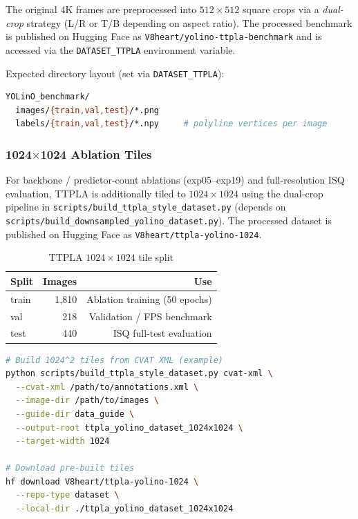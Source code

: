 \documentclass[11pt,a4paper]{article}
\begin{document}
The original 4K frames are preprocessed into $512 \times 512$ square crops via a
\emph{dual-crop} strategy (L/R or T/B depending on aspect ratio).
The processed benchmark is published on Hugging Face as
\texttt{V8heart/yolino-ttpla-benchmark} and is accessed via the
\texttt{DATASET\_TTPLA} environment variable.

Expected directory layout (set via \texttt{DATASET\_TTPLA}):
\begin{lstlisting}[language=bash, numbers=none, frame=none, backgroundcolor=\color{white}]
YOLinO_benchmark/
  images/{train,val,test}/*.png
  labels/{train,val,test}/*.npy     # polyline vertices per image
\end{lstlisting}

\subsubsection{1024$\times$1024 Ablation Tiles}
\label{subsec:ttpla_1024}

For backbone / predictor-count ablations (exp05--exp19) and full-resolution ISQ
evaluation, TTPLA is additionally tiled to $1024 \times 1024$ using the dual-crop
pipeline in \texttt{scripts/build\_ttpla\_style\_dataset.py}
(depends on \texttt{scripts/build\_downsampled\_yolino\_dataset.py}).
The processed dataset is published on Hugging Face as
\texttt{V8heart/ttpla-yolino-1024}.

\begin{table}[H]
\centering
\caption{TTPLA $1024 \times 1024$ tile split}
\begin{tabular}{lrr}
\toprule
Split & Images & Use \\
\midrule
train & 1,810 & Ablation training (50 epochs) \\
val   &   218 & Validation / FPS benchmark \\
test  &   440 & ISQ full-test evaluation \\
\bottomrule
\end{tabular}
\end{table}

\begin{lstlisting}[language=bash, numbers=none]
# Build 1024^2 tiles from CVAT XML (example)
python scripts/build_ttpla_style_dataset.py cvat-xml \
  --cvat-xml /path/to/annotations.xml \
  --image-dir /path/to/images \
  --guide-dir data_guide \
  --output-root ttpla_yolino_dataset_1024x1024 \
  --target-width 1024

# Download pre-built tiles
hf download V8heart/ttpla-yolino-1024 \
  --repo-type dataset \
  --local-dir ./ttpla_yolino_dataset_1024x1024
\end{lstlisting}
\end{document}
